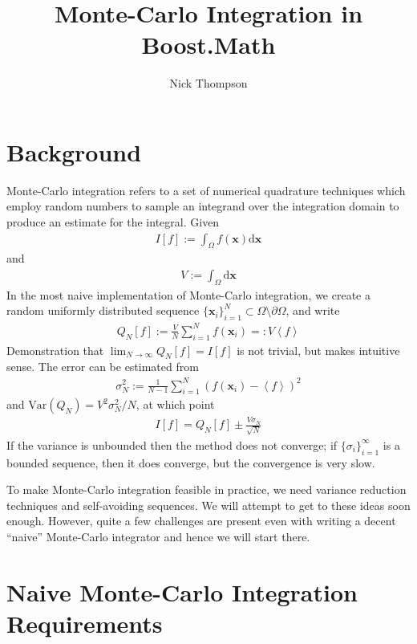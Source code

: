 \documentclass[landscape]{article}
\numberwithin{equation}{section}
\begin{document}

\title{Monte-Carlo Integration in Boost.Math}
\author{Nick Thompson}

\maketitle
\section{Background}

Monte-Carlo integration refers to a set of numerical quadrature techniques which employ random numbers to sample an integrand over the integration domain to produce an estimate for the integral.
Given
\begin{align*}
I[f] := \int_{\Omega} f(\mathbf{x}) \mathrm{d}\mathbf{x}
\end{align*}
and
\begin{align*}
V := \int_{\Omega} \mathrm{d}\mathbf{x}
\end{align*}
In the most naive implementation of Monte-Carlo integration, we create a random uniformly distributed sequence $\{ \mathbf{x}_{i}\}_{i=1}^{N} \subset \Omega \setminus \partial \Omega$, and write
\begin{align*}
Q_{N}[f] := \frac{V}{N} \sum_{i=1}^{N} f(\mathbf{x}_{i}) =: V\left<f \right>
\end{align*}
Demonstration that $\lim_{N\to \infty} Q_{N}[f] = I[f]$ is not trivial, but makes intuitive sense.
The error can be estimated from
\begin{align*}
\sigma_{N}^{2} := \frac{1}{N-1}\sum_{i=1}^{N} (f(\mathbf{x}_{i}) - \left< f \right>)^{2}
\end{align*}
and $\mathrm{Var}(Q_{N}) = V^2\sigma_{N}^{2}/N$, at which point
\begin{align*}
I[f] = Q_{N}[f] \pm \frac{V\sigma_{N}}{\sqrt{N}}
\end{align*}
If the variance is unbounded then the method does not converge; if $\{\sigma_{i}\}_{i=1}^{\infty}$ is a bounded sequence, then it does converge, but the convergence is very slow.

To make Monte-Carlo integration feasible in practice, we need variance reduction techniques and self-avoiding sequences.
We will attempt to get to these ideas soon enough.
However, quite a few challenges are present even with writing a decent ``naive'' Monte-Carlo integrator and hence we will start there.

\section{Naive Monte-Carlo Integration Requirements}
\end{document}
